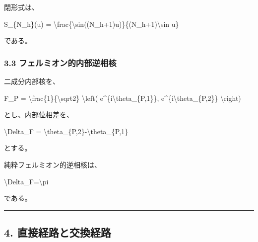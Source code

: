 \documentclass[
  a4paper,
]{article}
\newenvironment{Shaded}{}{}
\newcommand{\NormalTok}[1]{#1}
\begin{document}
閉形式は、

\begin{Shaded}
\begin{Highlighting}[]
\NormalTok{S\_\{N\_h\}(u)}
\NormalTok{=}
\NormalTok{\textbackslash{}frac\{\textbackslash{}sin((N\_h+1)u)\}\{(N\_h+1)\textbackslash{}sin u\}}
\end{Highlighting}
\end{Shaded}

である。

\subsubsection{3.3
フェルミオン的内部逆相核}\label{ux30d5ux30a7ux30ebux30dfux30aaux30f3ux7684ux5185ux90e8ux9006ux76f8ux6838}

二成分内部核を、

\begin{Shaded}
\begin{Highlighting}[]
\NormalTok{F\_P}
\NormalTok{=}
\NormalTok{\textbackslash{}frac\{1\}\{\textbackslash{}sqrt2\}}
\NormalTok{\textbackslash{}left(}
\NormalTok{e\^{}\{i\textbackslash{}theta\_\{P,1\}\},}
\NormalTok{e\^{}\{i\textbackslash{}theta\_\{P,2\}\}}
\NormalTok{\textbackslash{}right)}
\end{Highlighting}
\end{Shaded}

とし、内部位相差を、

\begin{Shaded}
\begin{Highlighting}[]
\NormalTok{\textbackslash{}Delta\_F}
\NormalTok{=}
\NormalTok{\textbackslash{}theta\_\{P,2\}{-}\textbackslash{}theta\_\{P,1\}}
\end{Highlighting}
\end{Shaded}

とする。

純粋フェルミオン的逆相核は、

\begin{Shaded}
\begin{Highlighting}[]
\NormalTok{\textbackslash{}Delta\_F=\textbackslash{}pi}
\end{Highlighting}
\end{Shaded}

である。

\begin{center}\rule{0.5\linewidth}{0.5pt}\end{center}

\subsection{4.
直接経路と交換経路}\label{ux76f4ux63a5ux7d4cux8defux3068ux4ea4ux63dbux7d4cux8def}
\end{document}
